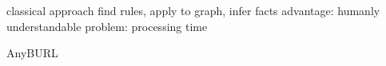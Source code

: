 classical approach
find rules, apply to graph, infer facts
advantage: humanly understandable
problem: processing time

AnyBURL
